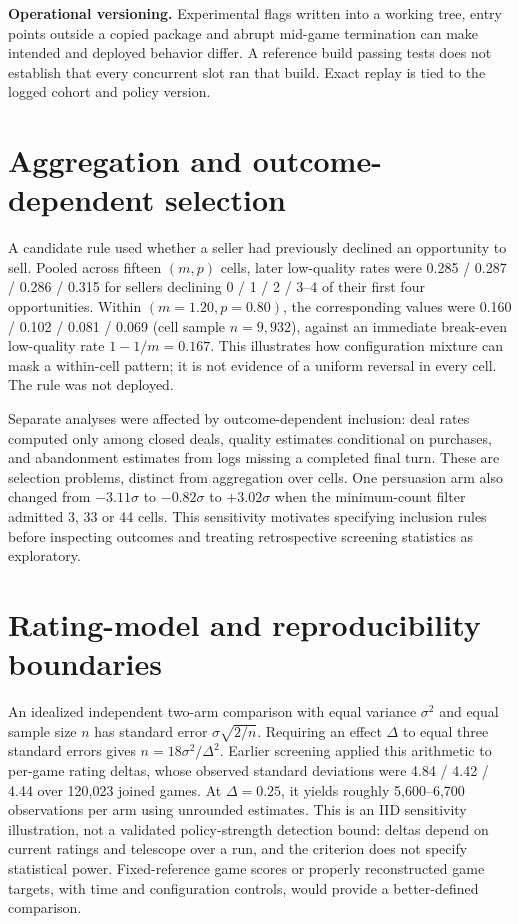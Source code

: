 \textbf{Operational versioning.} Experimental flags written into a working
tree, entry points outside a copied package and abrupt mid-game termination
can make intended and deployed behavior differ. A reference build passing
tests does not establish that every concurrent slot ran that build. Exact
replay is tied to the logged cohort and policy version.

\section{Aggregation and outcome-dependent selection}
\label{app:simpson}
A candidate rule used whether a seller had previously declined an opportunity
to sell. Pooled across fifteen $(m,p)$ cells, later low-quality rates were
0.285 / 0.287 / 0.286 / 0.315 for sellers declining 0 / 1 / 2 / 3--4 of their
first four opportunities. Within $(m=1.20,p=0.80)$, the corresponding values
were 0.160 / 0.102 / 0.081 / 0.069 (cell sample $n=9,932$), against an immediate
break-even low-quality rate $1-1/m=0.167$. This illustrates how configuration
mixture can mask a within-cell pattern; it is not evidence of a uniform reversal
in every cell. The rule was not deployed.

Separate analyses were affected by outcome-dependent inclusion: deal rates
computed only among closed deals, quality estimates conditional on purchases,
and abandonment estimates from logs missing a completed final turn. These are
selection problems, distinct from aggregation over cells. One persuasion arm
also changed from $-3.11\sigma$ to $-0.82\sigma$ to $+3.02\sigma$ when the
minimum-count filter admitted 3, 33 or 44 cells. This sensitivity motivates
specifying inclusion rules before inspecting outcomes and treating retrospective
screening statistics as exploratory.

\section{Rating-model and reproducibility boundaries}
\label{app:measurement}
An idealized independent two-arm comparison with equal variance $\sigma^2$
and equal sample size $n$ has standard error $\sigma\sqrt{2/n}$. Requiring an
effect $\Delta$ to equal three standard errors gives
$n=18\sigma^2/\Delta^2$. Earlier screening applied this arithmetic to
per-game rating deltas, whose observed standard deviations were
4.84 / 4.42 / 4.44 over 120,023 joined games. At $\Delta=0.25$, it yields
roughly 5,600--6,700 observations per arm using unrounded estimates. This is
an IID sensitivity illustration, not a validated policy-strength detection
bound: deltas depend on current ratings and telescope over a run, and the
criterion does not specify statistical power. Fixed-reference game scores or
properly reconstructed game targets, with time and configuration controls,
would provide a better-defined comparison.

